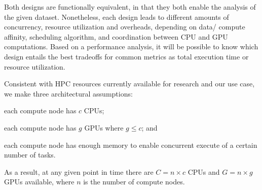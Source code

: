 Both designs are functionally equivalent, in that they both enable the
analysis of the given dataset. Nonetheless, each design leads to different
amounts of concurrency, resource utilization and overheads, depending on data/
compute affinity, scheduling algorithm, and coordination between CPU and GPU
computations. Based on a performance analysis, it will be possible to know
which design entails the best tradeoffs for common metrics as total execution
time or resource utilization.

Consistent with HPC resources currently available for research and our use
case, we make three architectural assumptions:
\begin{inparaenum}[(1)]
    \item each compute node has $c$ CPUs;
    \item each compute node has $g$ GPUs where $g \le c$; and
    \item each compute node has enough memory to enable concurrent execute of
    a certain number of tasks.
\end{inparaenum}
As a result, at any given point in time there are $C = n\times c$ CPUs and
$G = n\times g$ GPUs available, where $n$ is the number of compute nodes.

